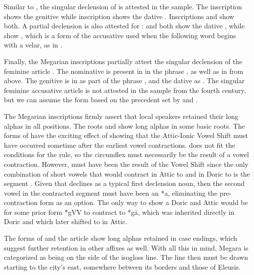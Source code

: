Similar to ,
the singular declension of 
is attested in the sample.
The inscription  shows the genitive  while inscription  shows the dative .
Inscriptions  and  show both.
A partial declension is also attested for :  and  both show the dative ,
while  show ,
which is a form of the accusative  used when the following word begins with a velar,
as in  .

Finally,
the Megarian inscriptions partially attest the singular declension of the feminine article .
The nominative is present in  in the phrase ,
as well as in   from above.
The genitive is in  as part of the phrase ,
and the dative as .
The singular feminine accusative article is not attested in the sample from the fourth century,
but we can assume the form  based on the precedent set by  and .

The Megarian inscriptions firmly assert that local speakers retained their long alphas in all positions.
The roots  and  show long alphas in some basic roots.
The forms of  have the exciting effect of showing that
the Attic-Ionic Vowel Shift must have occurred sometime after the earliest vowel contractions.
 does not fit the conditions for the  rule,
so the circumflex must necessarily be the result of a vowel contraction.
However,
 must have been the result of the Vowel Shift
since the only combination of short vowels that would contract in Attic to  and in Doric to  is the segment . 
Given that  declines as a typical first declension noun,
then the second vowel in the contracted segment must have been an *a,
eliminating the pre-contraction form  as an option.
The only way to show a Doric  and Attic  would be for some prior form *gVV
to contract to *gā,
which was inherited directly in Doric and which later shifted to  in Attic.

The forms of  and the article  show long alphas retained in case endings,
which suggest further retention in other affixes as well.
With all this in mind,
Megara is categorized as being on the  side of the isogloss line.
The line then must be drawn starting to the city's east,
somewhere between its borders and those of Eleusis.

